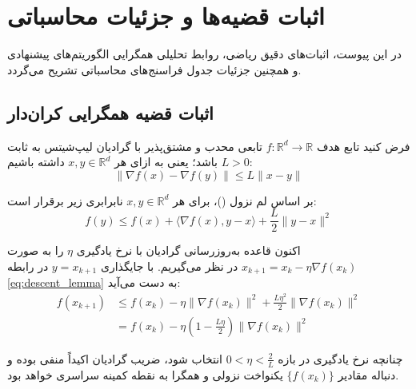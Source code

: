 
\chapter{اثبات قضیه‌ها و جزئیات محاسباتی}
\label{app:proofs}

در این پیوست، اثبات‌های دقیق ریاضی، روابط تحلیلی همگرایی الگوریتم‌های پیشنهادی و همچنین جزئیات جدول فراسنج‌های محاسباتی تشریح می‌گردد.

\section{اثبات قضیه همگرایی کران‌دار}
\label{sec:app_convergence}

فرض کنید تابع هدف $f: \mathbb{R}^d \to \mathbb{R}$ تابعی محدب و مشتق‌پذیر با گرادیان لیپ‌شیتس به ثابت $L > 0$ باشد؛ یعنی به ازای هر $x, y \in \mathbb{R}^d$ داشته باشیم:
\begin{equation}
\label{eq:lipschitz}
\|\nabla f(x) - \nabla f(y)\| \le L \|x - y\|
\end{equation}

بر اساس لم نزول ()، برای هر $x, y \in \mathbb{R}^d$ نابرابری زیر برقرار است:
\begin{equation}
\label{eq:descent_lemma}
f(y) \le f(x) + \langle \nabla f(x), y - x \rangle + \frac{L}{2} \|y - x\|^2
\end{equation}

اکنون قاعده به‌روزرسانی گرادیان با نرخ یادگیری $\eta$ را به صورت $x_{k+1} = x_k - \eta \nabla f(x_k)$ در نظر می‌گیریم. با جایگذاری $y = x_{k+1}$ در رابطه \eqref{eq:descent_lemma} به دست می‌آید:
\begin{align}
\label{eq:proof_step1}
f(x_{k+1}) &\le f(x_k) - \eta \|\nabla f(x_k)\|^2 + \frac{L \eta^2}{2} \|\nabla f(x_k)\|^2 \nonumber\\
&= f(x_k) - \eta \left(1 - \frac{L\eta}{2}\right) \|\nabla f(x_k)\|^2
\end{align}

چنانچه نرخ یادگیری در بازه $0 < \eta < \frac{2}{L}$ انتخاب شود، ضریب گرادیان اکیداً منفی بوده و دنباله مقادیر $\{f(x_k)\}$ یکنواخت نزولی و همگرا به نقطه کمینه سراسری خواهد بود.

